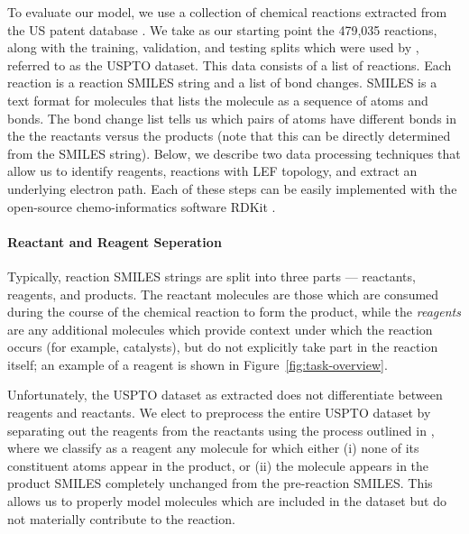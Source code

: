 

To evaluate our model, we use a collection of chemical reactions extracted from the US patent database \citep{Lowe2017}.
We take as our starting point the 479,035 reactions, along with the training, validation, and testing splits 
which were used by \citet{jin2017predicting}, referred to as the USPTO dataset.
This data consists of a list of reactions. Each reaction is a reaction SMILES string \citep{weininger1988smiles} and a list of bond changes.
SMILES is a text format for molecules that lists the molecule as a sequence of atoms and bonds.
The bond change list tells us which pairs of atoms have different bonds in the the reactants versus the products (note that this can be directly determined from the SMILES string).
Below, we describe two data processing techniques that allow us to identify reagents, reactions with LEF topology, and extract an underlying electron path. Each of these steps can be easily implemented with the open-source chemo-informatics software RDKit \citep{rdkit}.

 
\paragraph{Reactant and Reagent Seperation}
Typically, reaction SMILES strings are split into three parts --- reactants, reagents, and products.
The reactant molecules are those which are consumed during the course of the chemical reaction to form the product, 
while the {\em reagents} are any additional molecules which provide context under which the reaction occurs (for example, catalysts),
but do not explicitly take part in the reaction itself; an example of a reagent is shown in Figure~\ref{fig:task-overview}.


Unfortunately, the USPTO dataset as extracted does not differentiate between reagents and reactants.
We elect to preprocess the entire USPTO dataset by separating out the reagents from the reactants using the process outlined in \citet{schwaller2017found}, where we classify as a reagent any molecule for which either 
(i) none of its constituent atoms appear in the product, or 
(ii) the molecule appears in the product SMILES completely unchanged from the pre-reaction SMILES.
This allows us to properly model molecules which are included in the dataset but do not materially contribute to the reaction.

